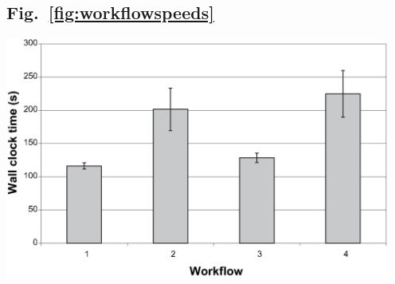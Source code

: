 \documentclass[a4paper]{article}
\begin{document}
\newpage

\subsection*{Fig.~\ref{fig:workflowspeeds}}

\begin{center}
\includegraphics[width=5in]{wfspeeds.eps}
\end{center}
\end{document}
